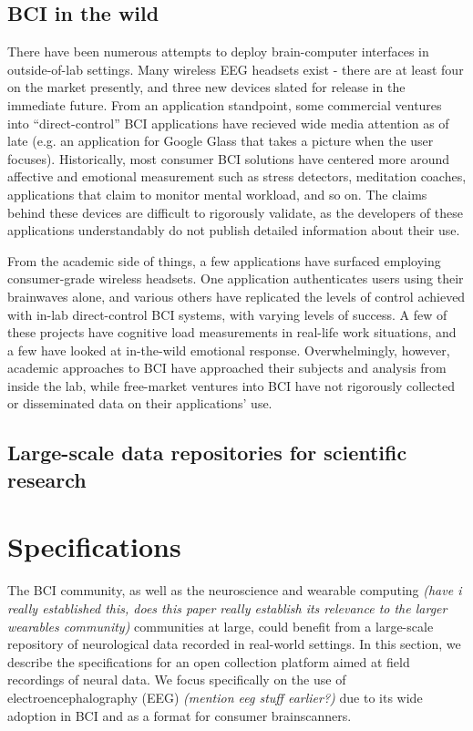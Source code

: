 \documentclass[a4paper,twoside]{article}
\begin{document}
\subsection{BCI in the wild}

There have been numerous attempts to deploy brain-computer interfaces in outside-of-lab settings. Many wireless EEG headsets exist - there are at least four on the market presently, and three new devices slated for release in the immediate future. From an application standpoint, some commercial ventures into ``direct-control'' BCI applications have recieved wide media attention as of late (e.g. an application for Google Glass that takes a picture when the user focuses). Historically, most consumer BCI solutions have centered more around affective and emotional measurement such as stress detectors, meditation coaches, applications that claim to monitor mental workload, and so on. The claims behind these devices are difficult to rigorously validate, as the developers of these applications understandably do not publish detailed information about their use.

From the academic side of things, a few applications have surfaced employing consumer-grade wireless headsets. One application authenticates users using their brainwaves alone, and various others have replicated the levels of control achieved with in-lab direct-control BCI systems, with varying levels of success. A few of these projects have cognitive load measurements in real-life work situations, and a few have looked at in-the-wild emotional response. Overwhelmingly, however, academic approaches to BCI have approached their subjects and analysis from inside the lab, while free-market ventures into BCI have not rigorously collected or disseminated data on their applications' use.


\subsection{Large-scale data repositories for scientific research}








\section{Specifications}

The BCI community, as well as the neuroscience and wearable computing \textit{(have i really established this, does this paper really establish its relevance to the larger wearables community)} communities at large, could benefit from a large-scale repository of neurological data recorded in real-world settings. In this section, we describe the specifications for an open collection platform aimed at field recordings of neural data. We focus specifically on the use of electroencephalography (EEG) \textit{(mention eeg stuff earlier?)} due to its wide adoption in BCI and as a format for consumer brainscanners.
\end{document}
